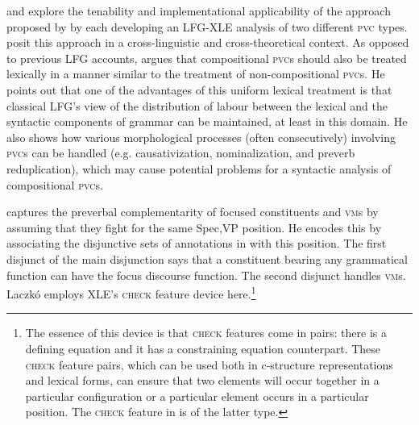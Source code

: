 \documentclass[output=paper,hidelinks]{langscibook}
\begin{document}
\largerpage[-2]
\citet{LaczkoRakosi2011} and \citet{RakosiLaczko2011} explore the tenability and implementational applicability of the approach proposed by \citet{forstetal10} by each developing an LFG-XLE analysis of two different \textsc{pvc} types. \citet{LaczkoRakosi2013} posit this approach in a cross-linguistic and cross-theoretical context. As opposed to previous LFG accounts, \citet{Laczko2013a} argues that compositional \textsc{pvc}s should also be treated lexically in a manner similar to the treatment of non-compositional \textsc{pvc}s. He points out that one of the advantages of this uniform lexical treatment is that classical LFG's view of the distribution of labour between the lexical and the syntactic components of grammar can be maintained, at least in this domain. He also shows how various morphological processes (often consecutively) involving \textsc{pvc}s can be handled (e.g. causativization, nominalization, and preverb reduplication), which may cause potential problems for a syntactic analysis of compositional \textsc{pvc}s.

\hspace*{-1.3pt}\citet{Laczko14} captures the preverbal complementarity of focused constituents and \textsc{vm}s by assuming that they fight for the same Spec,VP position. He encodes this by associating the disjunctive sets of annotations in  with this position. The first disjunct of the main disjunction says that a constituent bearing any grammatical function can have the focus discourse function. The second disjunct handles \textsc{vm}s. Laczkó employs XLE's \textsc{check} feature device here.\footnote{The essence of this device is that \textsc{check} features come in pairs: there is a defining equation and it has a constraining equation counterpart. These \textsc{check} feature pairs, which can be used both in c-structure representations and lexical forms, can ensure that two elements will occur together in a particular configuration or a particular element occurs in a particular position. The \textsc{check} feature in  is of the latter type.}
\end{document}
